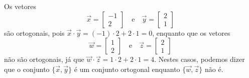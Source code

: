 \documentclass[../livro.tex]{subfiles}  %
\begin{document}
\begin{example}
	Os vetores
	\begin{equation}
	\vec{x} = \begin{bmatrix}
	-1 \\ 2
	\end{bmatrix} \quad \text{e} \quad
	\vec{y} = \begin{bmatrix}
	2 \\ 1
	\end{bmatrix}
	\end{equation} são ortogonais, pois $\vec{x} \cdot \vec{y} = (-1)\cdot 2 + 2 \cdot 1 = 0$, enquanto que os vetores
	\begin{equation}
	\vec{w} = \begin{bmatrix}
	1 \\ 2
	\end{bmatrix} \quad \text{e} \quad
	\vec{z} = \begin{bmatrix}
	2 \\ 1
	\end{bmatrix}
	\end{equation} não são ortogonais, já que $\vec{w} \cdot \vec{z} = 1\cdot 2 + 2 \cdot 1 = 4$. Nestes casos, podemos dizer que o conjunto $\{\vec{x}, \vec{y}\}$ é um conjunto ortogonal enquanto $\{\vec{w}, \vec{z}\}$ não é.
\end{example}
\end{document}
